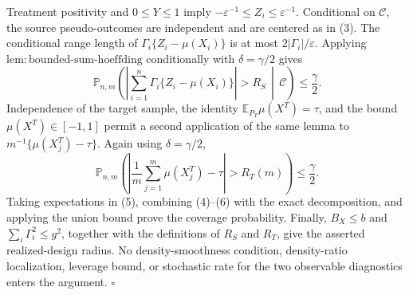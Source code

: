 Treatment positivity and \(0\le Y\le1\) imply \(-\varepsilon^{-1}\le Z_i\le\varepsilon^{-1}\). Conditional on \(\mathcal C\), the source pseudo-outcomes are independent and are centered as in (3). The conditional range length of \(\Gamma_i\{Z_i-\mu(X_i)\}\) is at most \(2|\Gamma_i|/\varepsilon\). Applying \(\mathrm{lem:bounded\text{-}sum\text{-}hoeffding}\) conditionally with \(\delta=\gamma/2\) gives
\[
\mathbb P_{n,m}\!\left(
\left|\sum_{i=1}^n\Gamma_i\{Z_i-\mu(X_i)\}\right|>R_S
\,\middle|\,\mathcal C\right)\le\frac\gamma2.
\tag{5}
\]
Independence of the target sample, the identity \(\mathbb E_{P_T}\mu(X^T)=\tau\), and the bound \(\mu(X^T)\in[-1,1]\) permit a second application of the same lemma to \(m^{-1}\{\mu(X_j^T)-\tau\}\). Again using \(\delta=\gamma/2\),
\[
\mathbb P_{n,m}\!\left(
\left|\frac1m\sum_{j=1}^m\mu(X_j^T)-\tau\right|>R_T(m)
\right)\le\frac\gamma2.
\tag{6}
\]
Taking expectations in (5), combining (4)--(6) with the exact decomposition, and applying the union bound prove the coverage probability. Finally, \(B_X\le b\) and \(\sum_i\Gamma_i^2\le g^2\), together with the definitions of \(R_S\) and \(R_T\), give the asserted realized-design radius. No density-smoothness condition, density-ratio localization, leverage bound, or stochastic rate for the two observable diagnostics enters the argument. \(\square\)